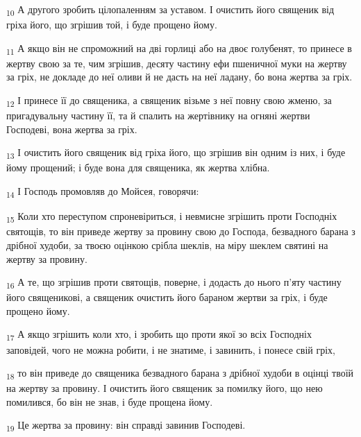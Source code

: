 \begin{tcolorbox}
\textsubscript{10} А другого зробить цілопаленням за уставом. І очистить його священик від гріха його, що згрішив той, і буде прощено йому.
\end{tcolorbox}
\begin{tcolorbox}
\textsubscript{11} А якщо він не спроможний на дві горлиці або на двоє голубенят, то принесе в жертву свою за те, чим згрішив, десяту частину ефи пшеничної муки на жертву за гріх, не докладе до неї оливи й не дасть на неї ладану, бо вона жертва за гріх.
\end{tcolorbox}
\begin{tcolorbox}
\textsubscript{12} І принесе її до священика, а священик візьме з неї повну свою жменю, за пригадувальну частину її, та й спалить на жертівнику на огняні жертви Господеві, вона жертва за гріх.
\end{tcolorbox}
\begin{tcolorbox}
\textsubscript{13} І очистить його священик від гріха його, що згрішив він одним із них, і буде йому прощений; і буде вона для священика, як жертва хлібна.
\end{tcolorbox}
\begin{tcolorbox}
\textsubscript{14} І Господь промовляв до Мойсея, говорячи:
\end{tcolorbox}
\begin{tcolorbox}
\textsubscript{15} Коли хто переступом спроневіриться, і невмисне згрішить проти Господніх святощів, то він приведе жертву за провину свою до Господа, безвадного барана з дрібної худоби, за твоєю оцінкою срібла шеклів, на міру шеклем святині на жертву за провину.
\end{tcolorbox}
\begin{tcolorbox}
\textsubscript{16} А те, що згрішив проти святощів, поверне, і додасть до нього п'яту частину його священикові, а священик очистить його бараном жертви за гріх, і буде прощено йому.
\end{tcolorbox}
\begin{tcolorbox}
\textsubscript{17} А якщо згрішить коли хто, і зробить що проти якої зо всіх Господніх заповідей, чого не можна робити, і не знатиме, і завинить, і понесе свій гріх,
\end{tcolorbox}
\begin{tcolorbox}
\textsubscript{18} то він приведе до священика безвадного барана з дрібної худоби в оцінці твоїй на жертву за провину. І очистить його священик за помилку його, що нею помилився, бо він не знав, і буде прощена йому.
\end{tcolorbox}
\begin{tcolorbox}
\textsubscript{19} Це жертва за провину: він справді завинив Господеві.
\end{tcolorbox}

